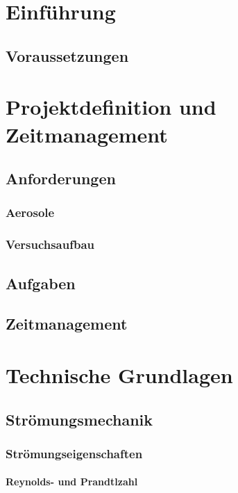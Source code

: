 \chapter{Einf\"{u}hrung}

\section{Voraussetzungen}


\chapter{Projektdefinition und Zeitmanagement}\label{ch:foundations}

\section{Anforderungen}
\subsection{Aerosole}
\subsection{Versuchsaufbau}
\section{Aufgaben}
\section{Zeitmanagement}

\chapter{Technische Grundlagen}\label{ch:foundations}
\section{Str\"{o}mungsmechanik}
\subsection{Str\"{o}mungseigenschaften}
\subsubsection{Reynolds- und Prandtlzahl}

